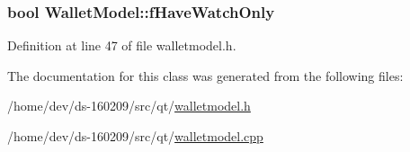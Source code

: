 \subsubsection[{f\+Have\+Watch\+Only}]{\setlength{\rightskip}{0pt plus 5cm}bool Wallet\+Model\+::f\+Have\+Watch\+Only}\label{class_wallet_model_ada7a868b3da256492ea1f19e28374495}


Definition at line 47 of file walletmodel.\+h.



The documentation for this class was generated from the following files\+:\begin{DoxyCompactItemize}
\item 
/home/dev/ds-\/160209/src/qt/\hyperlink{walletmodel_8h}{walletmodel.\+h}\item 
/home/dev/ds-\/160209/src/qt/\hyperlink{walletmodel_8cpp}{walletmodel.\+cpp}\end{DoxyCompactItemize}
